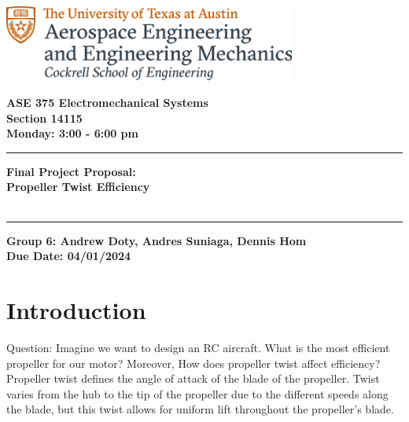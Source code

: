 \documentclass{article}
\begin{document}
\begin{titlepage}
  \centering
  \includegraphics[height=2.5cm]{ase-logo-formal.png}  %
  \vspace{1cm}  %
 
  \Large \textbf{ASE 375 Electromechanical Systems}\\
  \large \textbf{Section 14115}\\
  \vspace{0.5cm}
  \textbf{Monday: 3:00 - 6:00 pm}\\
 
  \vspace{1cm}
 
  \hrule
  \vspace{0.5cm}
 
  \Huge \textbf{Final Project Proposal: \\
                Propeller Twist Efficiency}\\
  \Huge \textbf{}\\
 
  \vspace{0.5cm}
  \hrule
 
  \vspace{1cm}
 
  \normalsize \textbf{Group 6: Andrew Doty, Andres Suniaga, Dennis Hom}\\
  \normalsize \textbf{Due Date: 04/01/2024}
 
\end{titlepage}
\newpage

\section{Introduction}
Question: Imagine we want to design an RC aircraft. What is the most efficient propeller for our motor? Moreover, How does propeller twist affect efficiency?
\\[2mm]
Propeller twist defines the angle of attack of the blade of the propeller. Twist varies from the hub to the tip of the propeller due to the different speeds along the blade, but this twist allows for uniform lift throughout the propeller's blade.
\end{document}
